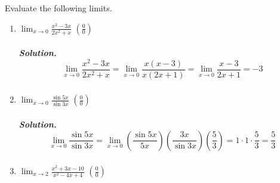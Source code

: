 \documentclass[
  letterpaper,
  DIV=11,
  numbers=noendperiod]{scrartcl}
\let\oldsubparagraph\subparagraph
\renewcommand{\subparagraph}[1]{\oldsubparagraph{#1}\mbox{}}
\theoremstyle{plain}
\theoremstyle{remark}
\begin{document}
Evaluate the following limits.

\begin{enumerate}
\def\labelenumi{\arabic{enumi}.}
\item
  \(\displaystyle\lim_{x \to 0} \frac{x^2-3x}{2x^2+x}\)
  \(\left(\frac{0}{0}\right)\)

  \hypertarget{solution.-displaystylelim_x-to-0-fracx2-3x2x2x-displaystylelim_x-to-0-fracxx-3x2x1displaystylelim_x-to-0-fracx-32x1-3}{%
  \subparagraph{\texorpdfstring{\emph{Solution}. \[
  \displaystyle\lim_{x \to 0} \frac{x^2-3x}{2x^2+x}= \displaystyle\lim_{x \to 0} \frac{x(x-3)}{x(2x+1)}=\displaystyle\lim_{x \to 0} \frac{x-3}{2x+1}=-3
  \]}{Solution. 
  \textbackslash displaystyle\textbackslash lim\_\{x \textbackslash to 0\} \textbackslash frac\{x\^{}2-3x\}\{2x\^{}2+x\}= \textbackslash displaystyle\textbackslash lim\_\{x \textbackslash to 0\} \textbackslash frac\{x(x-3)\}\{x(2x+1)\}=\textbackslash displaystyle\textbackslash lim\_\{x \textbackslash to 0\} \textbackslash frac\{x-3\}\{2x+1\}=-3
  }}\label{solution.-displaystylelim_x-to-0-fracx2-3x2x2x-displaystylelim_x-to-0-fracxx-3x2x1displaystylelim_x-to-0-fracx-32x1-3}}
\item
  \(\displaystyle\lim_{x \to 0} \frac{\sin5x}{\sin3x}\)
  \(\left(\frac{0}{0}\right)\)

  \hypertarget{solution.-displaystylelim_x-to-0-fracsin5xsin3xdisplaystylelim_x-to-0-leftfracsin5x5xrightleftfrac3xsin3xrightleftfrac53right1cdot1cdotfrac53frac53}{%
  \subparagraph{\texorpdfstring{\emph{Solution}. \[
  \displaystyle\lim_{x \to 0} \frac{\sin5x}{\sin3x}=\displaystyle\lim_{x \to 0} \left(\frac{\sin5x}{5x}\right)\left(\frac{3x}{\sin3x}\right)\left(\frac{5}{3}\right)=1\cdot1\cdot\frac{5}{3}=\frac{5}{3}
  \]}{Solution. 
  \textbackslash displaystyle\textbackslash lim\_\{x \textbackslash to 0\} \textbackslash frac\{\textbackslash sin5x\}\{\textbackslash sin3x\}=\textbackslash displaystyle\textbackslash lim\_\{x \textbackslash to 0\} \textbackslash left(\textbackslash frac\{\textbackslash sin5x\}\{5x\}\textbackslash right)\textbackslash left(\textbackslash frac\{3x\}\{\textbackslash sin3x\}\textbackslash right)\textbackslash left(\textbackslash frac\{5\}\{3\}\textbackslash right)=1\textbackslash cdot1\textbackslash cdot\textbackslash frac\{5\}\{3\}=\textbackslash frac\{5\}\{3\}
  }}\label{solution.-displaystylelim_x-to-0-fracsin5xsin3xdisplaystylelim_x-to-0-leftfracsin5x5xrightleftfrac3xsin3xrightleftfrac53right1cdot1cdotfrac53frac53}}
\item
  \(\displaystyle\lim_{x \to 2} \frac{x^2+3x-10}{x^2-4x+4}\)
  \(\left(\frac{0}{0}\right)\)


\end{enumerate}
\end{document}
